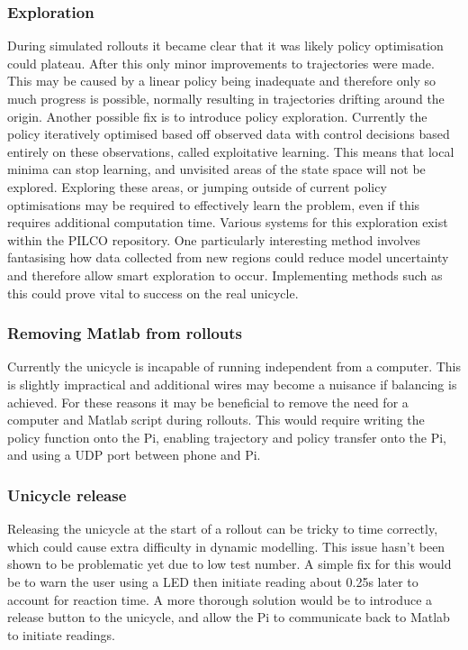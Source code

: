 \documentclass[twoside,twocolumn,12pt]{article}
\begin{document}
\subsubsection{Exploration}
During simulated rollouts it became clear that it was likely policy optimisation could plateau. After this only minor improvements to trajectories were made. This may be caused by a linear policy being inadequate and therefore only so much progress is possible, normally resulting in trajectories drifting around the origin.
\newline
Another possible fix is to introduce policy exploration. Currently the policy iteratively optimised based off observed data with control decisions based entirely on these observations, called exploitative learning. This means that local minima can stop learning, and unvisited areas of the state space will not be explored. Exploring these areas, or jumping outside of current policy optimisations may be required to effectively learn the problem, even if this requires additional computation time. 
\newline
Various systems for this exploration exist within the PILCO repository. One particularly interesting method involves fantasising how data collected from new regions could reduce model uncertainty and therefore allow smart exploration to occur. \cite{exp}
\newline
Implementing methods such as this could prove vital to success on the real unicycle.
\subsubsection{Removing Matlab from rollouts}
Currently the unicycle is incapable of running independent from a computer. This is slightly impractical and additional wires may become a nuisance if balancing is achieved. For these reasons it may be beneficial to remove the need for a computer and Matlab script during rollouts. This would require writing the policy function onto the Pi, enabling trajectory and policy transfer onto the Pi, and using a UDP port between phone and Pi.
\subsubsection{Unicycle release}
Releasing the unicycle at the start of a rollout can be tricky to time correctly, which could cause extra difficulty in dynamic modelling. This issue hasn't been shown to be problematic yet due to low test number.
\newline
A simple fix for this would be to warn the user using a LED then initiate reading about 0.25s later to account for reaction time. A more thorough solution would be to introduce a release button to the unicycle, and allow the Pi to communicate back to Matlab to initiate readings.
\end{document}
